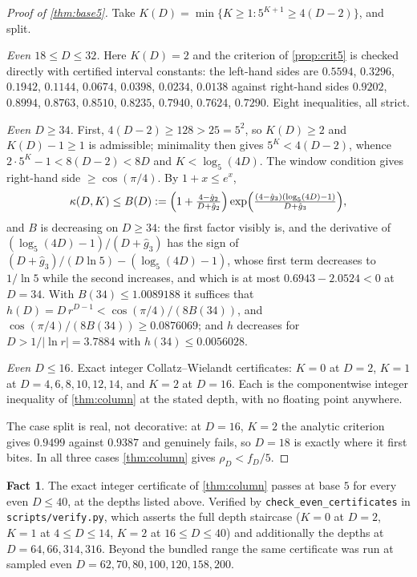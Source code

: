 \documentclass[11pt]{amsart}
\theoremstyle{definition}
\newtheorem{fact}[theorem]{Fact}
\theoremstyle{remark}
\begin{document}
\begin{proof}[Proof of \cref{thm:base5}]
Take $K(D) = \min\{K \ge 1 : 5^{K+1} \ge 4(D-2)\}$, and split.

\emph{Even $18 \le D \le 32$.} Here $K(D) = 2$ and the criterion of \cref{prop:crit5} is checked directly with certified interval constants: the left-hand sides are $0.5594$, $0.3296$, $0.1942$, $0.1144$, $0.0674$, $0.0398$, $0.0234$, $0.0138$ against right-hand sides $0.9202$, $0.8994$, $0.8763$, $0.8510$, $0.8235$, $0.7940$, $0.7624$, $0.7290$. Eight inequalities, all strict.

\emph{Even $D \ge 34$.} First, $4(D-2) \ge 128 > 25 = 5^2$, so $K(D) \ge 2$ and $K(D) - 1 \ge 1$ is admissible; minimality then gives $5^{K} < 4(D-2)$, whence $2\cdot 5^K - 1 < 8(D-2) < 8D$ and $K < \log_5(4D)$. The window condition gives right-hand side $\ge \cos(\pi/4)$. By $1 + x \le e^x$,
\[
  \kappa(D,K) \le B(D) := \Bigl(1 + \tfrac{4-\hat g_2}{D + \hat g_2}\Bigr)\exp\Bigl(\tfrac{(4-\hat g_3)(\log_5(4D)-1)}{D+\hat g_3}\Bigr),
\]
and $B$ is decreasing on $D \ge 34$: the first factor visibly is, and the derivative of $(\log_5(4D)-1)/(D+\hat g_3)$ has the sign of $(D+\hat g_3)/(D\ln 5) - (\log_5(4D)-1)$, whose first term decreases to $1/\ln 5$ while the second increases, and which is at most $0.6943 - 2.0524 < 0$ at $D = 34$. With $B(34) \le 1.0089188$ it suffices that $h(D) = D\,r^{D-1} < \cos(\pi/4)/(8B(34))$, and $\cos(\pi/4)/(8B(34)) \ge 0.0876069$; and $h$ decreases for $D > 1/\lvert\ln r\rvert = 3.7884$ with $h(34) \le 0.0056028$.

\emph{Even $D \le 16$.} Exact integer Collatz--Wielandt certificates: $K = 0$ at $D = 2$, $K = 1$ at $D = 4,6,8,10,12,14$, and $K = 2$ at $D = 16$. Each is the componentwise integer inequality of \cref{thm:column} at the stated depth, with no floating point anywhere.

The case split is real, not decorative: at $D = 16$, $K = 2$ the analytic criterion gives $0.9499$ against $0.9387$ and genuinely fails, so $D = 18$ is exactly where it first bites. In all three cases \cref{thm:column} gives $\rho_D < f_D/5$.
\end{proof}

\begin{fact}
\label{fact:cert5}
The exact integer certificate of \cref{thm:column} passes at base $5$ for every even $D \le 40$, at the depths listed above. Verified by \texttt{check\_even\_certificates} in \texttt{scripts/verify.py}, which asserts the full depth staircase ($K = 0$ at $D = 2$, $K = 1$ at $4 \le D \le 14$, $K = 2$ at $16 \le D \le 40$) and additionally the depths at $D = 64, 66, 314, 316$. Beyond the bundled range the same certificate was run at sampled even $D = 62, 70, 80, 100, 120, 158, 200$.
\end{fact}
\end{document}
